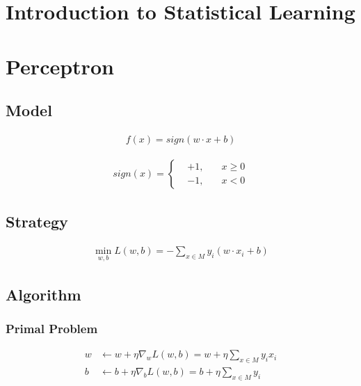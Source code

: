 \documentclass[11pt]{article}
\begin{document}
\begin{CJK*}{UTF8}{gbsn}
\maketitle

\par

\tableofcontents
\clearpage
\section{Introduction to Statistical Learning}

\section{Perceptron}
\subsection{Model}
\begin{align*}
	f(x) = sign(w\cdot x +b)
\end{align*}

\begin{align*}
	sign(x)=\left\{
\begin{aligned}
 &   +1, \quad & x\ge 0\\
 &   -1,  \quad & x <0
\end{aligned}
\right.
\end{align*}

\subsection{Strategy}
\begin{align*}
	\min_{w,b} L(w,b) = -\sum_{x\in M} y_i(w\cdot x_i + b)
\end{align*}

\subsection{Algorithm}
\subsubsection{Primal Problem}
\begin{align*}
	w &\leftarrow w + \eta \nabla_w L(w,b) = w + \eta \sum_{x\in M}y_ix_i \\
	b &\leftarrow b + \eta \nabla_b L(w,b) = b + \eta \sum_{x\in M}y_i \\
\end{align*}


\end{CJK*}
\end{document}
